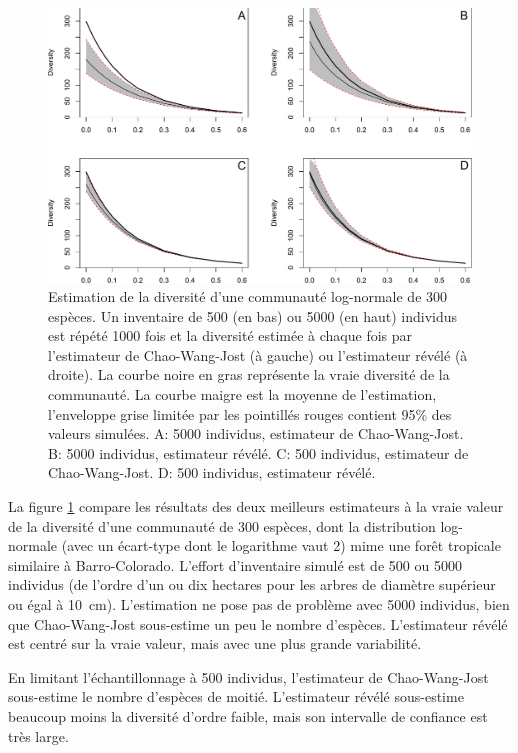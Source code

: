\documentclass[
  11pt,
  french,
  a4paper,
  extrafontsizes,onecolumn,openright
  ]{memoir}
\begin{document}
\begin{figure}

{\centering \includegraphics[width=1\linewidth]{images/Estimation} 

}

\caption{Estimation de la diversité d'une communauté log-normale de 300 espèces. Un inventaire de 500 (en bas) ou 5000 (en haut) individus est répété 1000 fois et la diversité estimée à chaque fois par l'estimateur de Chao-Wang-Jost (à gauche) ou l'estimateur révélé (à droite). La courbe noire en gras représente la vraie diversité de la communauté. La courbe maigre est la moyenne de l'estimation, l'enveloppe grise limitée par les pointillés rouges contient 95\% des valeurs simulées. A: 5000 individus, estimateur de Chao-Wang-Jost. B: 5000 individus, estimateur révélé. C: 500 individus, estimateur de Chao-Wang-Jost. D: 500 individus, estimateur révélé.}\label{fig:Estimation}
\end{figure}

\normalsize

La figure \ref{fig:Estimation} compare les résultats des deux meilleurs estimateurs à la vraie valeur de la diversité d'une communauté de 300 espèces, dont la distribution log-normale (avec un écart-type dont le logarithme vaut 2) mime une forêt tropicale similaire à Barro-Colorado.
L'effort d'inventaire simulé est de 500 ou 5000 individus (de l'ordre d'un ou dix hectares pour les arbres de diamètre supérieur ou égal à 10~cm).
L'estimation ne pose pas de problème avec 5000 individus, bien que Chao-Wang-Jost sous-estime un peu le nombre d'espèces.
L'estimateur révélé est centré sur la vraie valeur, mais avec une plus grande variabilité.

En limitant l'échantillonnage à 500 individus, l'estimateur de Chao-Wang-Jost sous-estime le nombre d'espèces de moitié.
L'estimateur révélé sous-estime beaucoup moins la diversité d'ordre faible, mais son intervalle de confiance est très large.
\end{document}
